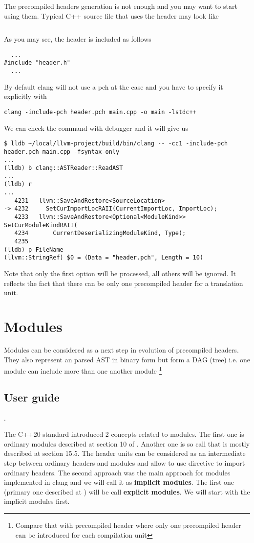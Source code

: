 The precompiled headers generation is not enough and you may want to
start using them. Typical C++ source file that uses the header may
look like
\inputminted{c++}{./src/pch/simple/main.cpp}
As you may see, the header is included as follows
\begin{verbatim}
  ...
#include "header.h"
  ...
\end{verbatim}
By default clang will not use a pch at the case and you have to
specify it explicitly with
\begin{verbatim}
clang -include-pch header.pch main.cpp -o main -lstdc++
\end{verbatim}
We can check the command with debugger and it will give us
\begin{verbatim}
$ lldb ~/local/llvm-project/build/bin/clang -- -cc1 -include-pch header.pch main.cpp -fsyntax-only
...
(lldb) b clang::ASTReader::ReadAST                                             
...
(lldb) r
...
   4231   llvm::SaveAndRestore<SourceLocation>
-> 4232     SetCurImportLocRAII(CurrentImportLoc, ImportLoc);
   4233   llvm::SaveAndRestore<Optional<ModuleKind>> SetCurModuleKindRAII(
   4234       CurrentDeserializingModuleKind, Type);
   4235 
(lldb) p FileName
(llvm::StringRef) $0 = (Data = "header.pch", Length = 10)
\end{verbatim}
Note that only the first  option will be
processed, all others will be ignored. It reflects the fact that there
can be only one precompiled header for a translation unit.

\section{Modules}
Modules can be considered as a next step in evolution of precompiled
headers. They also represent an parsed AST in binary form but form a
DAG (tree) i.e. one module can include more than one another module
\footnote{Compare that with precompiled header where only one
precompiled header can be introduced for each compilation unit}
\subsection{User guide}.

The C++20 standard \citep{standard:cpp20} introduced 2 concepts
related to modules. The first one is ordinary modules described at
section 10 of \citep{standard:cpp20}. Another one is so call
 that is mostly described at section 15.5.
The header units can be considered as an intermediate step between
ordinary headers and modules and allow to use
 directive to import ordinary headers. The
second approach was the main approach for modules implemented in clang
and we will call it as \textbf{implicit modules}. The first one (primary one
described at \citep{standard:cpp20}) will be call \textbf{explicit
  modules}. We will start with the implicit modules first.

